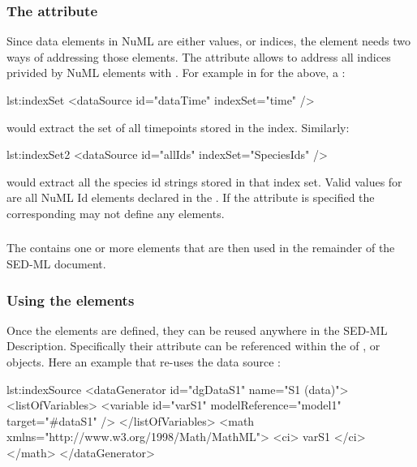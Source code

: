 \subsubsection{The  attribute}
\label{sec:indexSet}
Since data elements in NuML are either values, or indices, the \SedDataSource element needs two ways of addressing those elements. The  attribute allows to address all indices privided by NuML elements with . For example in for the   above, a :

\begin{myXmlLst}{}{lst:indexSet}
        <dataSource id="dataTime" indexSet="time" />
\end{myXmlLst} 

would extract the set of all timepoints stored in the index. Similarly: 

\begin{myXmlLst}{}{lst:indexSet2}
        <dataSource id="allIds" indexSet="SpeciesIds" />
\end{myXmlLst} 

would extract all the species id strings stored in that index set. Valid values for  are all NuML Id elements declared in the . If the  attribute is specified the corresponding  may not define any  elements.


\subsubsection{}
\label{class:listOfSlices}
The  contains one or more \SedSlice elements that are then used in the remainder of the SED-ML document.


\subsubsection{Using the  elements}
Once the \SedDataSource elements are defined, they can be reused anywhere in the SED-ML Description. Specifically their  attribute can be referenced within the  of ,  or  objects. Here an example that re-uses the data source :

\begin{myXmlLst}{}{lst:indexSource}
   <dataGenerator id="dgDataS1" name="S1 (data)">
     <listOfVariables>
       <variable id="varS1" modelReference="model1" target="#dataS1" />
     </listOfVariables>
     <math xmlns="http://www.w3.org/1998/Math/MathML">
       <ci> varS1 </ci>
     </math>
   </dataGenerator>
\end{myXmlLst} 

